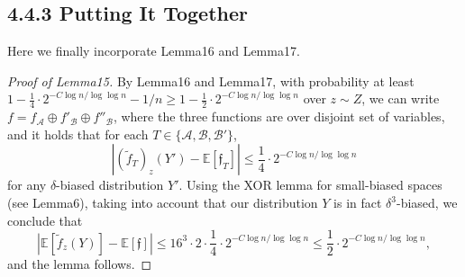 \subsection*{4.4.3 Putting It Together}
Here we finally incorporate Lemma16 and Lemma17.
\begin{proof}[Proof of Lemma15]
By Lemma16 and Lemma17, with probability at least $1-\frac14\cdot2^{-C\log n/\log\log n}-1/n\ge1-\frac12\cdot2^{-C\log n/\log\log n}$ over $z\sim Z$, we can write $f=f_{\mathcal A}\oplus f'_{\mathcal B}\oplus f''_{\mathcal B}$, where the three functions are over disjoint set of variables, and it holds that for each $T\in\{\mathcal A,\mathcal B,\mathcal B'\}$,
\[
|(\widetilde f_T)_z(Y')-\mathbb E[\mathfrak f_T]|
\le\frac14\cdot2^{-C\log n/\log\log n}
\]
for any $\delta$-biased distribution $Y'$. Using the XOR lemma for small-biased spaces (see Lemma6), taking into account that our distribution $Y$ is in fact $\delta^3$-biased, we conclude that
\[
|\mathbb E[\widetilde f_z(Y)]-\mathbb E[\mathfrak f]|
\le16^3\cdot2\cdot\frac14\cdot2^{-C\log n/\log\log n}
\le\frac12\cdot2^{-C\log n/\log\log n},
\]
and the lemma follows.
\end{proof}
